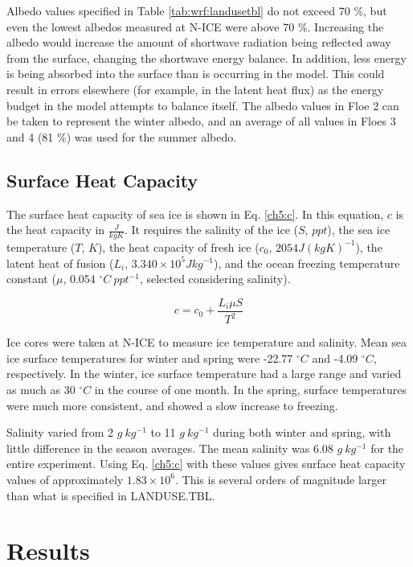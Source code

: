 Albedo values specified in Table \ref{tab:wrf:landusetbl} do not exceed 70 $\%$, but even the lowest albedos measured at N-ICE were above 70 $\%$. Increasing the albedo would increase the amount of shortwave radiation being reflected away from the surface, changing the shortwave energy balance. In addition, less energy is being absorbed into the surface than is occurring in the model. This could result in errors elsewhere (for example, in the latent heat flux) as the energy budget in the model attempts to balance itself. The albedo values in Floe 2 can be taken to represent the winter albedo, and an average of all values in Floes 3 and 4 (81 $\%$) was used for the summer albedo.

\subsection{Surface Heat Capacity}

The surface heat capacity of sea ice is shown in Eq. \ref{ch5:c}. In this equation, $c$ is the heat capacity in $\frac{J}{kg K}$. It requires the salinity of the ice ($S$, $ppt$), the sea ice temperature ($T$, $K$), the heat capacity of fresh ice ($c_{0}$, $2054 J(kg K)^{-1}$), the latent heat of fusion ($L_{i}$, $3.340 \times 10^{5} Jkg^{-1}$), and the ocean freezing temperature constant ($\mu$, 0.054 $^{\circ}C~ppt^{-1}$, selected considering salinity). 

\begin{equation}\label{ch5:c}
c = c_{0} + \frac{L_{i}\mu S}{T^{2}}
\end{equation}

Ice cores were taken at N-ICE to measure ice temperature and salinity. Mean sea ice surface temperatures for winter and spring were -22.77 $^{\circ}C$ and -4.09 $^{\circ}C$, respectively. In the winter, ice surface temperature had a large range and varied as much as 30 $^{\circ}C$ in the course of one month. In the spring, surface temperatures were much more consistent, and showed a slow increase to freezing.

Salinity varied from 2 $g~kg^{-1}$ to 11 $g~kg^{-1}$ during both winter and spring, with little difference in the season averages. The mean salinity was 6.08 $g~kg^{-1}$ for the entire experiment. Using Eq. \ref{ch5:c} with these values gives surface heat capacity values of approximately $1.83 \times 10^{6}$. This is several orders of magnitude larger than what is specified in LANDUSE.TBL.

\section{Results}

